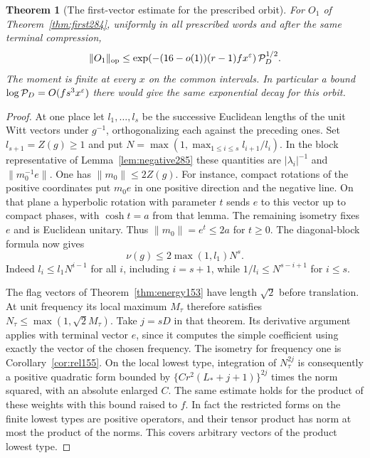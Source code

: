 \documentclass[a4paper,11pt]{article}
\newtheorem{theorem}[proposition]{Theorem}
\theoremstyle{definition}
\theoremstyle{remark}
\numberwithin{equation}{section}
\begin{document}
\begin{theorem}[The first-vector estimate for the prescribed orbit]\leavevmode
\label{thm:energy285}
For \(O_1\) of Theorem~\ref{thm:first284}, uniformly in all
prescribed words and after the same terminal compression,
\[
  \|O_1\|_{\rm op}
    \le \exp\!\left(-(16-o(1))(r-1)f x^\varepsilon\right)
                          {\cal P}_D^{1/2}.
\]
The moment is finite at every \(x\) on the common intervals.
In particular a bound \(\log{\cal P}_D=O(fs^3x^\varepsilon)\)
there would give the same exponential decay for this orbit.
\end{theorem}
\begin{proof}
At one place let \(l_1,\ldots,l_s\) be the successive
Euclidean lengths of the unit Witt vectors under \(g^{-1}\),
orthogonalizing each against the preceding ones. Set
\(l_{s+1}=Z(g)\ge1\) and put
\(N=\max(1,\max_{1\le i\le s}l_{i+1}/l_i)\).
In the block representative of Lemma~\ref{lem:negative285}
these quantities are \(|\lambda_i|^{-1}\) and
\(\|m_0^{-1}e\|\). One has \(\|m_0\|\le2Z(g)\).
For instance, compact rotations of the positive coordinates
put \(m_0 e\) in one positive direction and the negative
line. On that plane a hyperbolic rotation with parameter
\(t\) sends \(e\) to this vector up to compact phases, with
\(\cosh t=a\) from that lemma. The remaining isometry fixes
\(e\) and is Euclidean unitary. Thus \(\|m_0\|=e^{t}\le2a\)
for \(t\ge0\). The diagonal-block formula now gives
\[
 \nu(g)\le2\max(1,l_1)N^s .
\]
Indeed \(l_i\le l_1N^{i-1}\) for all \(i\), including
\(i=s+1\), while \(1/l_i\le N^{s-i+1}\) for \(i\le s\).

The flag vectors of Theorem~\ref{thm:energy153} have length
\(\sqrt2\) before translation. At unit frequency its local
maximum \(M_\tau\) therefore satisfies
\(N_\tau\le\max(1,\sqrt2 M_\tau)\).
Take \(j=sD\) in that theorem. Its derivative argument
applies with terminal vector \(e\), since it computes the
simple coefficient using exactly the vector of the chosen
frequency. The isometry for frequency one is
Corollary~\ref{cor:rel155}. On the local lowest type,
integration of \(N_\tau^{2j}\) is consequently a positive
quadratic form bounded by
\(\{C r^2(L_*+j+1)\}^{2j}\) times the norm squared, with
an absolute enlarged \(C\). The same estimate holds for
the product of these weights with this bound raised to \(f\).
In fact the restricted forms on the finite lowest types
are positive operators, and their tensor product has norm
at most the product of the norms. This covers arbitrary
vectors of the product lowest type.


\end{proof}
\end{document}
